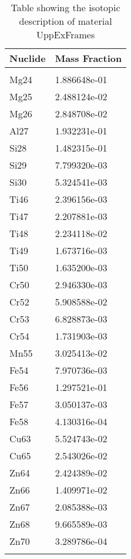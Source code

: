 \begin{centering}
\begin{longtable}[ht!]
\caption{Table showing the isotopic description of material PPWheelsDrives}
\label{table:material_PPWheelsDrives}
\end{longtable}\clearpage

\begin{longtable}[ht!]
{ p{} | p{} }
\hline
Nuclide & Mass Fraction\\
\hline
\\
Mg24 & 1.886648e-01\\
Mg25 & 2.488124e-02\\
Mg26 & 2.848708e-02\\
Al27 & 1.932231e-01\\
Si28 & 1.482315e-01\\
Si29 & 7.799320e-03\\
Si30 & 5.324541e-03\\
Ti46 & 2.396156e-03\\
Ti47 & 2.207881e-03\\
Ti48 & 2.234118e-02\\
Ti49 & 1.673716e-03\\
Ti50 & 1.635200e-03\\
Cr50 & 2.946330e-03\\
Cr52 & 5.908588e-02\\
Cr53 & 6.828873e-03\\
Cr54 & 1.731903e-03\\
Mn55 & 3.025413e-02\\
Fe54 & 7.970736e-03\\
Fe56 & 1.297521e-01\\
Fe57 & 3.050137e-03\\
Fe58 & 4.130316e-04\\
Cu63 & 5.524743e-02\\
Cu65 & 2.543026e-02\\
Zn64 & 2.424389e-02\\
Zn66 & 1.409971e-02\\
Zn67 & 2.085388e-03\\
Zn68 & 9.665589e-03\\
Zn70 & 3.289786e-04\\

\caption{Table showing the isotopic description of material UppExFrames}
\label{table:material_UppExFrames}
\end{longtable}\clearpage


\end{centering}
